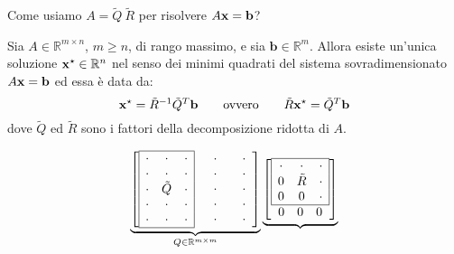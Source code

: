 Come usiamo $A=\tilde{Q} \ \tilde{R}$ per risolvere $A\mathbf{x} =\mathbf{b}$?
\begin{theorem}
Sia $A\in \mathbb{R}^{m\times n}$, $m\geqslant n$, di rango massimo, e sia $\mathbf{b} \in \mathbb{R}^{m}$. Allora esiste un'unica soluzione $\mathbf{x}^{\star } \in \mathbb{R}^{n}$ nel senso dei minimi quadrati del sistema sovradimensionato $A\mathbf{x} =\mathbf{b}$ ed essa è data da:
\begin{equation*}
\mathbf{x}^{\star } =\tilde{R}^{-1}\tilde{Q}^{T}\mathbf{b} \qquad \text{ovvero} \qquad \tilde{R}\mathbf{x}^{\star } =\tilde{Q}^{T}\mathbf{b}
\end{equation*}
dove $\tilde{Q}$ ed $\tilde{R}$ sono i fattori della decomposizione ridotta di $A$.
\end{theorem}
\begin{equation*}
\underbrace{\begin{bmatrix}
\begin{array}{|c c c|}
\hline
\cdot  & \cdot  & \cdot \\
\cdot  & \cdot  & \cdot \\
\cdot  & \tilde{Q} & \cdot \\
\cdot  & \cdot  & \cdot \\
\cdot  & \cdot  & \cdot \\
\hline
\end{array} & \begin{array}{ c }
\cdot \\
\cdot \\
\cdot \\
\cdot \\
\cdot
\end{array} & \begin{array}{ c }
\cdot \\
\cdot \\
\cdot \\
\cdot \\
\cdot
\end{array}
\end{bmatrix}}_{Q\in \mathbb{R}^{m\times m}}\underbrace{\begin{bmatrix}
\begin{array}{|c c c|}
\hline
\cdot  & \cdot  & \cdot \\
0 & \tilde{R} & \cdot \\
0 & 0 & \cdot \\
\hline
\end{array}\\
\begin{array}{ c c c }
0 & 0 & 0
\end{array}\\

\end{bmatrix}}
\end{equation*}
